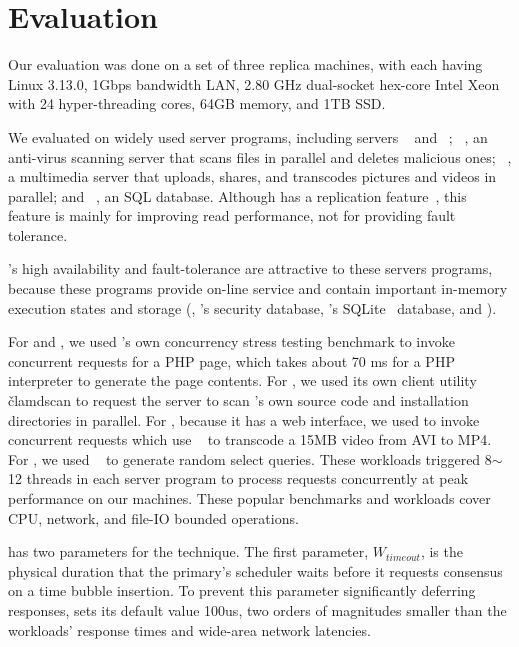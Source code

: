 \section{Evaluation} \label{sec:eval}

Our evaluation was done on a set of three replica machines, with each having 
Linux 3.13.0, 1Gbps bandwidth LAN, 2.80 GHz dual-socket hex-core Intel Xeon 
with 24 hyper-threading cores, 64GB memory, and 1TB SSD.

We evaluated \xxx on \nprog widely used server programs, 
including \http servers \apache~\cite{apache} and \mongoose~\cite{mongoose}; 
\clamav~\cite{clamav}, an anti-virus scanning 
server that scans files in parallel and deletes malicious ones; 
\mediatomb~\cite{mediatomb}, a \upnp multimedia server that uploads, shares, 
and transcodes pictures and videos in parallel; and \mysql~\cite{mysql}, an 
SQL database. Although \mysql has a replication 
feature~\cite{mysql:replication}, this feature is mainly for improving read 
performance, not for providing \smr fault tolerance.

\smr's high availability and fault-tolerance are attractive to these 
servers programs, because these programs provide on-line service and contain 
important in-memory execution states and storage (\eg, \clamav's 
security database, \mediatomb's SQLite~\cite{sqlite} database, and \mysql).

For \apache and \mongoose, we used \apache's own concurrency stress testing 
benchmark \ab to invoke concurrent \http requests for a PHP page, which takes 
about 70 ms for a PHP interpreter to generate the page contents. For \clamav, 
we used its own client utility \v{clamdscan} to request the server to scan 
\clamav's own source code and installation directories in parallel. For 
\mediatomb, because it has a web interface, we used \ab to invoke concurrent 
requests which use \mencoder~\cite{mencoder} to transcode a 15MB video from AVI 
to MP4. For \mysql, we used \sysbench~\cite{sysbench} to generate random select 
queries. These workloads triggered 8$\sim$12 threads in each server program to 
process requests concurrently at peak performance on our machines. These 
popular benchmarks and workloads cover CPU, network, and file-IO 
bounded operations.  

\xxx has two parameters for the \timealgo technique. The first 
parameter, $W_{timeout}$, is the physical duration that the primary's \dmt 
scheduler waits before it requests consensus on a time bubble insertion. To 
prevent this parameter significantly deferring responses, \xxx sets its 
default value 100us, two orders of magnitudes smaller than the workloads' 
response times and wide-area network latencies.

